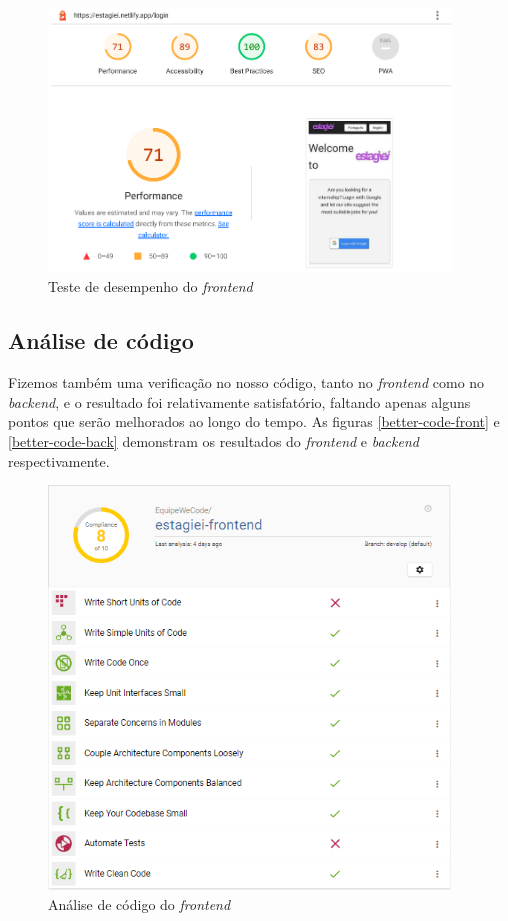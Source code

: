 \begin{figure}[H]
	\centering
	\caption{\label{lighthouse-test}Teste de desempenho do \textit{\gls{frontend}}}
	\includegraphics[width=0.95\textwidth]{../imagens/web-tests/lighthouse-test.png}
\end{figure}

\subsection{Análise de código}
Fizemos também uma verificação no nosso código, tanto no \textit{\gls{frontend}} como no \textit{\gls{backend}}, e o resultado foi relativamente satisfatório, faltando apenas alguns pontos que serão melhorados ao longo do tempo. As figuras \autoref{better-code-front} e \autoref{better-code-back} demonstram os resultados do \textit{\gls{frontend}} e \textit{\gls{backend}} respectivamente.

\begin{figure}[H]
	\centering
	\caption{\label{better-code-front}Análise de código do \textit{\gls{frontend}}}
	\includegraphics[width=0.95\textwidth]{../imagens/web-tests/better-code-front.png}
\end{figure}

